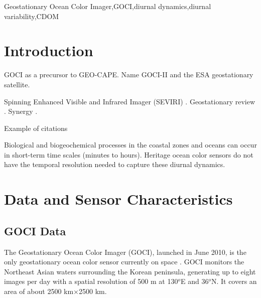 \documentclass[onecolumn,3p,letterpaper,11pt]{elsarticle}
\begin{document}
\begin{frontmatter}
\begin{abstract}
%
 
%


%

\end{abstract}

\begin{keyword}
Geostationary Ocean Color Imager\sep GOCI\sep diurnal dynamics\sep diurnal variability\sep CDOM
\end{keyword}

\end{frontmatter}
\section{Introduction}
GOCI as a precursor to GEO-CAPE. 
Name GOCI-II and the ESA geostationary satellite.

Spinning Enhanced Visible and Infrared Imager (SEVIRI) \citet{Neukermans2009,Neukermans2012}. Geostationary review \citet{Ruddick2014}. Synergy \citet{Vanhellemont2014}.

Example of citations \citet{Ryu2011,He2013,Hu2016}

Biological and biogeochemical processes in the coastal zones and oceans can occur in short-term time scales (minutes to hours). Heritage ocean color sensors do not have the temporal resolution needed to capture these diurnal dynamics.
\section{Data and Sensor Characteristics}
\subsection{GOCI Data}
The Geostationary Ocean Color Imager (GOCI), launched in June 2010, is the only geostationary ocean color sensor currently on space \citep{Ryu2012}. GOCI monitors the Northeast Asian waters surrounding the Korean peninsula, generating up to eight images per day with a spatial resolution of 500 m at 130$^o$E and 36$^o$N. It covers an area of about 2500 km$\times$2500 km. 
\end{document}
